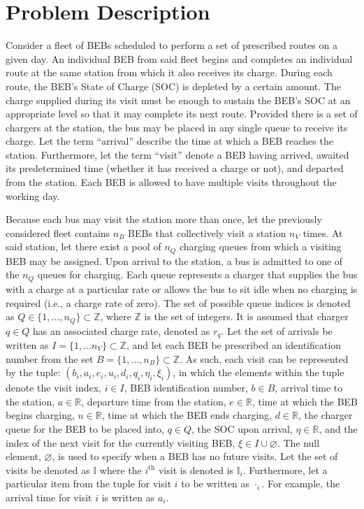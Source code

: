 \documentclass[ee,thesis]{usuthesis}
\newcommand{\visit}{(b_i, a_i, e_i, u_i, d_i, q_i, \eta_i, \xi_i)}
\newcommand{\I}{\mathbb{I}}                 %
\newcommand{\Iset}{I}                       %
\begin{document}
\section{Problem Description}
\label{sec:problem-description}
Consider a fleet of BEBs scheduled to perform a set of prescribed routes on a given day. An individual BEB from said
fleet begins and completes an individual route at the same station from which it also receives its charge. During each
route, the BEB's State of Charge (SOC) is depleted by a certain amount. The charge supplied during its visit must be
enough to sustain the BEB's SOC at an appropriate level so that it may complete its next route. Provided there is a set
of chargers at the station, the bus may be placed in any single queue to receive its charge. Let the term ``arrival''
describe the time at which a BEB reaches the station. Furthermore, let the term ``visit'' denote a BEB having arrived,
awaited its predetermined time (whether it has received a charge or not), and departed from the station. Each BEB is
allowed to have multiple visits throughout the working day.

Because each bus may visit the station more than once, let the previously considered fleet contains \(n_B\) BEBs that
collectively visit a station \(n_V\) times. At said station, let there exist a pool of \(n_Q\) charging queues from which a
visiting BEB may be assigned. Upon arrival to the station, a bus is admitted to one of the \(n_Q\) queues for charging.
Each queue represents a charger that supplies the bus with a charge at a particular rate or allows the bus to sit idle
when no charging is required (i.e., a charge rate of zero). The set of possible queue indices is denoted as \(Q \in
\{1,...,n_Q\} \subset \mathbb{Z}\), where \(\mathbb{Z}\) is the set of integers. It is assumed that charger \(q \in Q\) has an associated charge rate,
denoted as \(r_q\). Let the set of arrivals be written as \(\Iset = \{ 1, ... n_V \} \subset \mathbb{Z}\), and let each BEB be prescribed
an identification number from the set \(B = \{ 1, ..., n_B \} \subset \mathbb{Z}\). As such, each visit can be represented by the tuple:
\(\visit\), in which the elements within the tuple denote the visit index, \(i \in I\), BEB identification number, \(b \in B\),
arrival time to the station, \(a \in \mathbb{R}\), departure time from the station, \(e \in \mathbb{R}\), time at which the BEB begins charging,
\(u \in \mathbb{R}\), time at which the BEB ends charging, \(d \in \mathbb{R}\), the charger queue for the BEB to be placed into, \(q \in Q\), the SOC
upon arrival, \(\eta \in \mathbb{R}\), and the index of the next visit for the currently visiting BEB, \(\xi \in I \cup \varnothing\). The null
element, \(\varnothing\), is used to specify when a BEB has no future visits. Let the set of visits be denoted as \(\I\)
where the \(i^{\text{th}}\) visit is denoted is \(\I_i\). Furthermore, let a particular item from the tuple for visit \(i\) to
be written as \(\cdot_i\). For example, the arrival time for visit \(i\) is written as \(a_i\).
\end{document}
